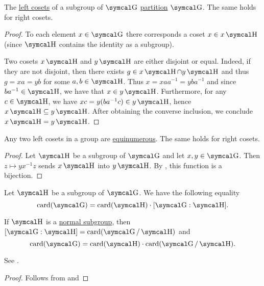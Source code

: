 \begin{lemma}\label{thm:group_coset_partition}
  The \hyperref[def:group_cosets]{left cosets} of a subgroup of \( \CG \) \hyperref[def:set_partition]{partition} \( \CG \). The same holds for right cosets.
\end{lemma}
\begin{proof}
  To each element \( x \in \CG \) there corresponds a coset \( x \in x\CH \) (since \( \CH \) contains the identity as a subgroup).

  Two cosets \( x\CH \) and \( y\CH \) are either disjoint or equal. Indeed, if they are not disjoint, then there exists \( g \in x\CH \cap y\CH \) and thus \( g = xa = yb \) for some \( a, b \in \CH \). Thus \( x = x a a^{-1} = y b a^{-1} \) and since \( b a^{-1} \in \CH \), we have that \( x \in y\CH \). Furthermore, for any \( c \in \CH \), we have \( xc = y(b a^{-1} c) \in y\CH \), hence \( x\CH \subseteq y\CH \). After obtaining the converse inclusion, we conclude \( x\CH = y\CH \).
\end{proof}

\begin{lemma}\label{thm:group_coset_bijection}
  Any two left cosets in a group are \hyperref[def:equinumerous_sets]{equinumerous}. The same holds for right cosets.
\end{lemma}
\begin{proof}
  Let \( \CH \) be a subgroup of \( \CG \) and let \( x, y \in \CG \). Then \( z \mapsto y x^{-1} z \) sends \( x\CH \) into \( y\CH \). By , this function is a bijection.
\end{proof}

\begin{theorem}\label{thm:lagranges_theorem_for_groups}
  Let \( \CH \) be a subgroup of \( \CG \). We have the following equality
  \begin{equation}\label{eq:thm:lagranges_theorem_for_groups/index}
    \Card(\CG) = \Card(\CH) \cdot [\CG : \CH].
  \end{equation}

  If \( \CH \) is a \hyperref[def:normal_subgroup]{normal subgroup}, then \( [\CG : \CH] = \Card(\CG / \CH) \) and
  \begin{equation}\label{eq:thm:lagranges_theorem_for_groups/index}
    \Card(\CG) = \Card(\CH) \cdot \Card(\CG / \CH).
  \end{equation}

  See .
\end{theorem}
\begin{proof}
  Follows from  and 
\end{proof}

